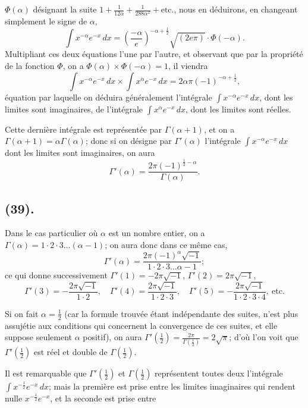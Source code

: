 \documentclass{article}
\begin{document}
$\Phi(\alpha)$ désignant la suite $1+\frac{1}{12\alpha}+\frac{1}{288\alpha^{2}}+\text{etc.}$, nous en déduirons, en changeant simplement le signe de $\alpha$,
\[ \int x^{-\alpha}e^{-x}\,dx=\left(\frac{-\alpha}{e}\right)^{-\alpha+\frac{1}{2}}\sqrt{(2e\pi)}\cdot\Phi(-\alpha). \]
Multipliant ces deux équations l'une par l'autre, et observant que par la propriété de la fonction $\Phi$, on a $\Phi(\alpha)\times\Phi(-\alpha)=1$, il viendra
\[ \int x^{-\alpha}e^{-x}\,dx\times\int x^{\alpha}e^{-x}\,dx=2\alpha\pi(-1)^{-\alpha+\frac{1}{2}}, \]
équation par laquelle on déduira généralement l'intégrale $\displaystyle\int x^{-\alpha}e^{-x}\,dx$, dont les limites sont imaginaires, de l'intégrale $\displaystyle\int x^{\alpha}e^{-x}\,dx$, dont les limites sont réelles.

Cette dernière intégrale est représentée par $\Gamma(\alpha+1)$, et on a $\Gamma(\alpha+1)=\alpha\Gamma(\alpha)$; donc si on désigne par $\Gamma'(\alpha)$ l'intégrale $\displaystyle\int x^{-\alpha}e^{-x}\,dx$ dont les limites sont imaginaires, on aura
\[ \Gamma'(\alpha)=\frac{2\pi(-1)^{\frac{1}{2}-\alpha}}{\Gamma(\alpha)}. \tag{1} \]

\subsection*{(39).}

Dans le cas particulier où $\alpha$ est un nombre entier, on a $\Gamma(\alpha)=1\cdot2\cdot3\ldots(\alpha-1)$; on aura donc dans ce même cas,
\[ \Gamma'(\alpha)=\frac{2\pi(-1)^{\alpha}\sqrt{-1}}{1\cdot2\cdot3\ldots\alpha-1}; \]
ce qui donne successivement $\Gamma'(1)=-2\pi\sqrt{-1}$, $\Gamma'(2)=2\pi\sqrt{-1}$,
\[ \Gamma'(3)=-\frac{2\pi\sqrt{-1}}{1\cdot2},\quad\Gamma'(4)=\frac{2\pi\sqrt{-1}}{1\cdot2\cdot3},\quad\Gamma'(5)=-\frac{2\pi\sqrt{-1}}{1\cdot2\cdot3\cdot4},\ \text{etc.} \]

Si on fait $\alpha=\frac{1}{2}$ (car la formule trouvée étant indépendante des suites, n'est plus assujétie aux conditions qui concernent la convergence de ces suites, et elle suppose seulement $\alpha$ positif), on aura $\Gamma'\left(\frac{1}{2}\right)=\frac{2\pi}{\Gamma\left(\frac{1}{2}\right)}=2\sqrt{\pi}$; d'où l'on voit que $\Gamma'\left(\frac{1}{2}\right)$ est réel et double de $\Gamma\left(\frac{1}{2}\right)$.

Il est remarquable que $\Gamma'\left(\frac{1}{2}\right)$ et $\Gamma\left(\frac{1}{2}\right)$ représentent toutes deux l'intégrale $\displaystyle\int x^{-\frac{1}{2}}e^{-x}\,dx$; mais la première est prise entre les limites imaginaires qui rendent nulle $x^{-\frac{1}{2}}e^{-x}$, et la seconde est prise entre
\end{document}
